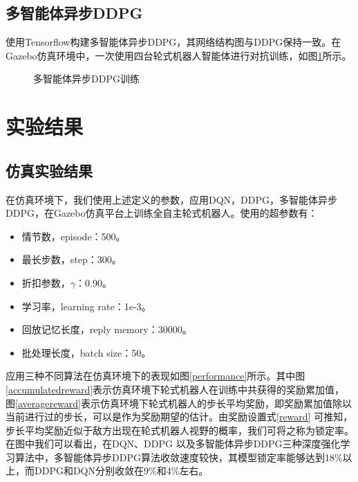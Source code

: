 \subsection{多智能体异步DDPG}
使用Tensorflow构建多智能体异步DDPG，其网络结构图与DDPG保持一致。在Gazebo仿真环境中，一次使用四台轮式机器人智能体进行对抗训练，如图\ref{multia}所示。
\begin{figure}[ht]
\centering
{}
\caption{多智能体异步DDPG训练}\label{multia}
\end{figure}

\section{实验结果}
\subsection{仿真实验结果}
在仿真环境下，我们使用上述定义的参数，应用DQN，DDPG，多智能体异步DDPG，在Gazebo仿真平台上训练全自主轮式机器人。使用的超参数有：
\begin{itemize}
  \item 情节数，episode：500。
  \item 最长步数，step：300。
  \item 折扣参数，$\gamma$：0.90。
  \item 学习率，learning rate：1e-3。
  \item 回放记忆长度，reply memory：30000。
  \item 批处理长度，batch size：50。
\end{itemize}

应用三种不同算法在仿真环境下的表现如图\ref{performance}所示。其中图\ref{accumulatedreward}表示仿真环境下轮式机器人在训练中共获得的奖励累加值，图\ref{averagereward}表示仿真环境下轮式机器人的步长平均奖励，即奖励累加值除以当前进行过的步长，可以是作为奖励期望的估计。由奖励设置式\ref{reward} 可推知，步长平均奖励近似于敌方出现在轮式机器人视野的概率，我们可将之称为锁定率。在图中我们可以看出，在DQN、DDPG 以及多智能体异步DDPG三种深度强化学习算法中，多智能体异步DDPG算法收敛速度较快，其模型锁定率能够达到18\%以上，而DDPG和DQN分别收敛在9\%和4\%左右。

